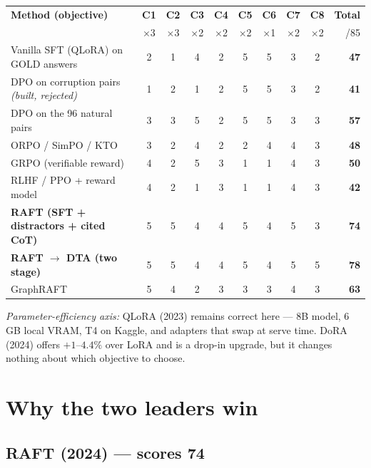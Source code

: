 \documentclass[11pt,a4paper]{article}
\begin{document}
\begin{table}[h]\centering\footnotesize
\setlength{\tabcolsep}{4pt}
\begin{tabular}{l ccccccc c r}
\toprule
\textbf{Method (objective)} & \textbf{C1} & \textbf{C2} & \textbf{C3} & \textbf{C4} & \textbf{C5} & \textbf{C6} & \textbf{C7} & \textbf{C8} & \textbf{Total} \\
 & $\times$3 & $\times$3 & $\times$2 & $\times$2 & $\times$2 & $\times$1 & $\times$2 & $\times$2 & /85 \\
\midrule
Vanilla SFT (QLoRA) on GOLD answers & 2 & 1 & 4 & 2 & 5 & 5 & 3 & 2 & \textbf{47} \\
\rowcolor{rowgray} DPO on corruption pairs \emph{(built, rejected)} & 1 & 2 & 1 & 2 & 5 & 5 & 3 & 2 & \textbf{41} \\
DPO on the 96 natural pairs & 3 & 3 & 5 & 2 & 5 & 5 & 3 & 3 & \textbf{57} \\
\rowcolor{rowgray} ORPO / SimPO / KTO & 3 & 2 & 4 & 2 & 2 & 4 & 4 & 3 & \textbf{48} \\
GRPO (verifiable reward) & 4 & 2 & 5 & 3 & 1 & 1 & 4 & 3 & \textbf{50} \\
\rowcolor{rowgray} RLHF / PPO + reward model & 4 & 2 & 1 & 3 & 1 & 1 & 4 & 3 & \textbf{42} \\
\textbf{RAFT (SFT + distractors + cited CoT)} & 5 & 5 & 4 & 4 & 5 & 4 & 5 & 3 & \textbf{74} \\
\rowcolor{rowgray} \textbf{RAFT $\rightarrow$ DTA (two stage)} & 5 & 5 & 4 & 4 & 5 & 4 & 5 & 5 & \textbf{78} \\
GraphRAFT & 5 & 4 & 2 & 3 & 3 & 3 & 4 & 3 & \textbf{63} \\
\bottomrule
\end{tabular}
\end{table}

\noindent\textit{Parameter-efficiency axis:} QLoRA (2023) remains correct here --- 8B model, 6\,GB local
VRAM, T4 on Kaggle, and adapters that swap at serve time. DoRA (2024) offers $+1$--$4.4\%$ over LoRA
and is a drop-in upgrade, but it changes nothing about which objective to choose.

\section{Why the two leaders win}

\subsection*{RAFT (2024) --- scores 74}
\end{document}
